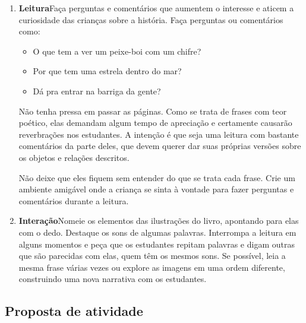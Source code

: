 \documentclass[11pt]{extarticle}
\begin{document}
\begin{enumerate}
\item \textbf{Leitura}\quad Faça perguntas e comentários que aumentem o 
interesse e aticem a curiosidade das crianças sobre a história. Faça 
perguntas ou comentários como: 

\begin{itemize}
\item O que tem a ver um peixe-boi com um chifre?
\item Por que tem uma estrela dentro do mar?
\item Dá pra entrar na barriga da gente?
\end{itemize}

Não tenha pressa em passar as páginas. Como se trata de frases 
com teor poético, elas demandam algum tempo de apreciação
e certamente causarão reverbrações nos estudantes. 
A intenção é que seja uma leitura com bastante comentários
da parte deles, que devem querer dar suas próprias versões
sobre os objetos e relações descritos.  

Não deixe que eles fiquem sem entender do que se trata cada frase. Crie 
um ambiente amigável onde a criança se sinta à vontade para fazer 
perguntas e comentários durante a leitura.


\item \textbf{Interação}\quad Nomeie os elementos das ilustrações 
do livro, apontando para elas com o dedo. Destaque os sons de algumas 
palavras. Interrompa a leitura em alguns momentos e peça que 
os estudantes repitam palavras e digam outras que são parecidas com elas,
quem têm os mesmos sons. Se possível, 
leia a mesma frase várias vezes ou explore as imagens em uma ordem 
diferente, construindo uma nova narrativa com os estudantes. 

\end{enumerate}


\subsection{Proposta de atividade}

\end{document}
